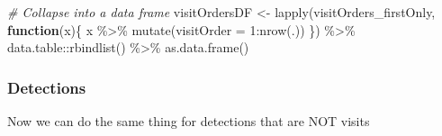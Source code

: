 \documentclass[
]{article}
\newenvironment{Shaded}{\begin{snugshade}}{\end{snugshade}}
\newcommand{\AttributeTok}[1]{\textcolor[rgb]{0.77,0.63,0.00}{#1}}
\newcommand{\CommentTok}[1]{\textcolor[rgb]{0.56,0.35,0.01}{\textit{#1}}}
\newcommand{\ControlFlowTok}[1]{\textcolor[rgb]{0.13,0.29,0.53}{\textbf{#1}}}
\newcommand{\DecValTok}[1]{\textcolor[rgb]{0.00,0.00,0.81}{#1}}
\newcommand{\FunctionTok}[1]{\textcolor[rgb]{0.00,0.00,0.00}{#1}}
\newcommand{\NormalTok}[1]{#1}
\newcommand{\OtherTok}[1]{\textcolor[rgb]{0.56,0.35,0.01}{#1}}
\newcommand{\SpecialCharTok}[1]{\textcolor[rgb]{0.00,0.00,0.00}{#1}}
\begin{document}
\begin{Shaded}
\begin{Highlighting}[]
\CommentTok{\# Collapse into a data frame}
\NormalTok{visitOrdersDF }\OtherTok{\textless{}{-}} \FunctionTok{lapply}\NormalTok{(visitOrders\_firstOnly, }\ControlFlowTok{function}\NormalTok{(x)\{}
\NormalTok{  x }\SpecialCharTok{\%\textgreater{}\%} \FunctionTok{mutate}\NormalTok{(}\AttributeTok{visitOrder =} \DecValTok{1}\SpecialCharTok{:}\FunctionTok{nrow}\NormalTok{(.))}
\NormalTok{\}) }\SpecialCharTok{\%\textgreater{}\%}
\NormalTok{  data.table}\SpecialCharTok{::}\FunctionTok{rbindlist}\NormalTok{() }\SpecialCharTok{\%\textgreater{}\%}
  \FunctionTok{as.data.frame}\NormalTok{()}
\end{Highlighting}
\end{Shaded}

\hypertarget{detections}{%
\subsubsection{Detections}\label{detections}}

Now we can do the same thing for detections that are NOT visits
\end{document}
